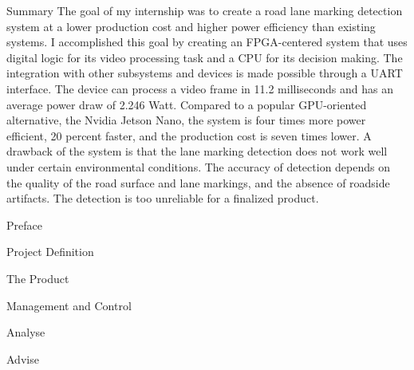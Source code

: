 \documentclass{matthijs}
\begin{document}
\begin{hoofdstuk*}{Summary}
		The goal of my internship was to create a road lane marking detection system at a lower production cost and higher power efficiency than existing systems.
		I accomplished this goal by creating an FPGA-centered system that uses digital logic for its video processing task and a CPU for its decision making.
		The integration with other subsystems and devices is made possible through a UART interface.
		The device can process a video frame in 11.2 milliseconds and has an average power draw of 2.246 Watt.
		Compared to a popular GPU-oriented alternative, the Nvidia Jetson Nano, the system is four times more power efficient, 20 percent faster, and the production cost is seven times lower.
		A drawback of the system is that the lane marking detection does not work well under certain environmental conditions.
		The accuracy of detection depends on the quality of the road surface and lane markings, and the absence of roadside artifacts.
		The detection is too unreliable for a finalized product.

	\end{hoofdstuk*}

	\begin{inhoudspagina}

	\end{inhoudspagina}


	\begin{hoofdstuk*}{Preface}

	\end{hoofdstuk*}
	
	\begin{hoofdstuk}{Project Definition}

	\end{hoofdstuk}
	
	\begin{hoofdstuk}{The Product}

	\end{hoofdstuk}
	
	\begin{hoofdstuk}{Management and Control}

	\end{hoofdstuk}
	
	\begin{hoofdstuk}{Analyse}

	\end{hoofdstuk}
	
	\begin{hoofdstuk}{Advise}

	\end{hoofdstuk}
	
\end{document}
